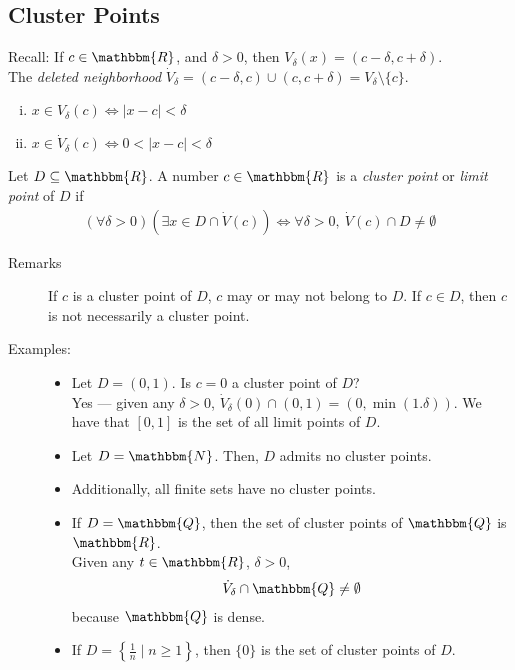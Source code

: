 \documentclass[10pt]{extarticle}
\newcommand{\N}{\mathbbm{N}}
\newcommand{\Q}{\mathbbm{Q}}
\newcommand{\R}{\mathbbm{R}}
\begin{document}
  \subsection{Cluster Points}%
    Recall: If $c\in\R$, and $\delta > 0$, then $V_{\delta}(x) = (c-\delta, c+\delta)$.\\

    The \textit{deleted neighborhood} $\dot{V}_{\delta} = (c-\delta,c) \cup (c,c+\delta) = V_{\delta}\setminus \{c\}$.
    \begin{enumerate}[(i)]
      \item $x\in V_{\delta}(c) \Leftrightarrow |x-c| < \delta$
      \item $x\in \dot{V}_{\delta}(c) \Leftrightarrow 0 < |x-c| < \delta$
    \end{enumerate}
    Let $D \subseteq \R$. A number $c\in\R$ is a \textit{cluster point} or \textit{limit point} of $D$ if 
    \begin{align*}
      (\forall \delta > 0)(\exists x\in D \cap \dot{V}(c)) \Leftrightarrow \forall \delta > 0,~\dot{V}(c)\cap D \neq \emptyset
    \end{align*}
    \begin{description}
      \item[Remarks] If $c$ is a cluster point of $D$, $c$ may or may not belong to $D$. If $c\in D$, then $c$ is not necessarily a cluster point.
      \item[Examples:]\hfill
        \begin{itemize}
          \item Let $D = (0,1)$. Is $c = 0$ a cluster point of $D$?\\

            Yes --- given any $\delta > 0$, $\dot{V}_{\delta}(0) \cap (0,1) = (0,\min(1.\delta))$. We have that $[0,1]$ is the set of all limit points of $D$.
          \item Let $D = \N$. Then, $D$ admits no cluster points.
          \item Additionally, all finite sets have no cluster points.
          \item If $D = \Q$, then the set of cluster points of $\Q$ is $\R$.\\

            Given any $t\in\R$, $\delta > 0$,
            \begin{align*}
              \dot{V}_{\delta} \cap \Q \neq \emptyset
            \end{align*}
            because $\Q$ is dense.
          \item If $D = \left\{\frac{1}{n}\mid n\geq 1\right\}$, then $\{0\}$ is the set of cluster points of $D$.
        \end{itemize}
    \end{description}
\end{document}

